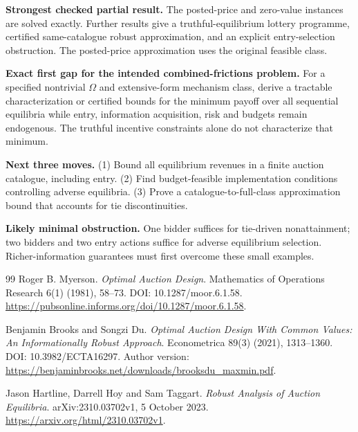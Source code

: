 \documentclass[11pt,a4paper]{article}
\theoremstyle{definition}
\begin{document}
\textbf{Strongest checked partial result.} The posted-price and zero-value instances are solved exactly. Further results give a truthful-equilibrium lottery programme, certified same-catalogue robust approximation, and an explicit entry-selection obstruction. The posted-price approximation uses the original feasible class.

\textbf{Exact first gap for the intended combined-frictions problem.} For a specified nontrivial $\Omega$ and extensive-form mechanism class, derive a tractable characterization or certified bounds for the minimum payoff over all sequential equilibria while entry, information acquisition, risk and budgets remain endogenous. The truthful incentive constraints alone do not characterize that minimum.

\textbf{Next three moves.} (1) Bound all equilibrium revenues in a finite auction catalogue, including entry. (2) Find budget-feasible implementation conditions controlling adverse equilibria. (3) Prove a catalogue-to-full-class approximation bound that accounts for tie discontinuities.

\textbf{Likely minimal obstruction.} One bidder suffices for tie-driven nonattainment; two bidders and two entry actions suffice for adverse equilibrium selection. Richer-information guarantees must first overcome these small examples.

\clearpage
\begin{thebibliography}{99}
Roger B. Myerson. \emph{Optimal Auction Design}. Mathematics of Operations Research 6(1) (1981), 58--73. DOI: 10.1287/moor.6.1.58. \url{https://pubsonline.informs.org/doi/10.1287/moor.6.1.58}.

Benjamin Brooks and Songzi Du. \emph{Optimal Auction Design With Common Values: An Informationally Robust Approach}. Econometrica 89(3) (2021), 1313--1360. DOI: 10.3982/ECTA16297. Author version: \url{https://benjaminbrooks.net/downloads/brooksdu_maxmin.pdf}.

Jason Hartline, Darrell Hoy and Sam Taggart. \emph{Robust Analysis of Auction Equilibria}. arXiv:2310.03702v1, 5 October 2023. \url{https://arxiv.org/html/2310.03702v1}.

\end{thebibliography}
\end{document}
